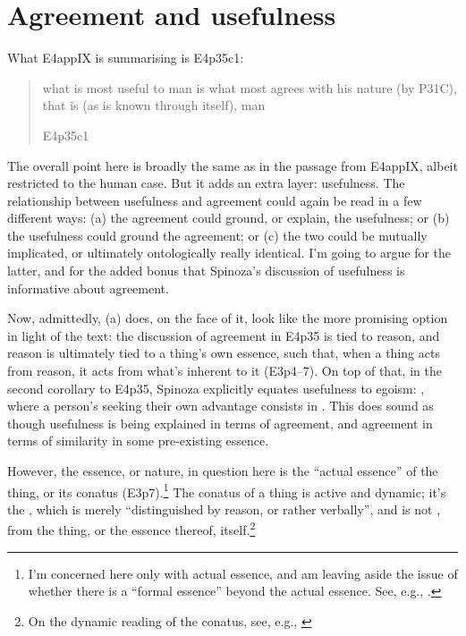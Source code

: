 \documentclass{article}
\newcommand\foreign[2]{\foreignlanguage{#1}{\emph{#2}}}
\begin{document}
\section{Agreement and usefulness}\label{sec:Use}

What E4app\RN{9} is summarising is E4p35c1: \blockquote[E4p35c1]{what is most useful to man is what most agrees \textins{\foreign{latin}{convenit}} with his nature (by P31C), that is (as is known through itself), man}. The overall point here is broadly the same as in the passage from E4app\RN{9}, albeit restricted to the human case. But it adds an extra layer: usefulness. The relationship between usefulness and agreement could again be read in a few different ways: (a) the agreement could ground, or explain, the usefulness; or (b) the usefulness could ground the agreement; or (c) the two could be mutually implicated, or ultimately ontologically really identical. I'm going to argue for the latter, and for the added bonus that Spinoza's discussion of usefulness is informative about agreement.

Now, admittedly, (a) does, on the face of it, look like the more promising option in light of the text: the discussion of agreement in E4p35 is tied to reason, and reason is ultimately tied to a thing's own essence, such that, when a thing acts from reason, it acts from what's inherent to it (E3p4–7). On top of that, in the second corollary to E4p35, Spinoza explicitly equates usefulness to egoism: , where a person's seeking their own advantage consists in . This does sound as though usefulness is being explained in terms of agreement, and agreement in terms of similarity in some pre-existing essence.

However, the essence, or nature, in question here is the \enquote{actual essence} of the thing, or its conatus (E3p7).\footnote{I'm concerned here only with actual essence, and am leaving aside the issue of whether there is a \enquote{formal essence} beyond the actual essence. See, e.g., \cites{Laerke:2017,Nadler:2012,Ward:2011}.}
The conatus of a thing is active and dynamic; it's the , which is merely \enquote{distinguished by reason, or rather verbally}, and is not , from the thing, or the essence thereof, itself.\footnote{On the dynamic reading of the conatus, see, e.g., \cites{Williams:2019}[][Part 4, ch. 13]{RenzExplainability}}
\end{document}

